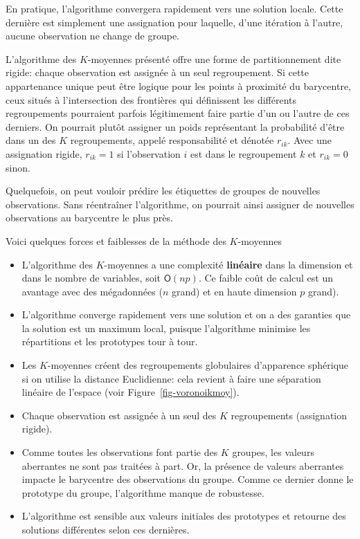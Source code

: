 \documentclass[
  11pt,
  letterpaper,
]{scrbook}
\providecommand{\tightlist}{%
  \setlength{\itemsep}{0pt}\setlength{\parskip}{0pt}}\usepackage{longtable,booktabs,array}
\theoremstyle{definition}
\theoremstyle{remark}
\begin{document}
En pratique, l'algorithme convergera rapidement vers une solution
locale. Cette dernière est simplement une assignation pour laquelle,
d'une itération à l'autre, aucune observation ne change de groupe.

L'algorithme des \(K\)-moyennes présenté offre une forme de
partitionnement dite rigide: chaque observation est assignée à un seul
regroupement. Si cette appartenance unique peut être logique pour les
points à proximité du barycentre, ceux situés à l'intersection des
frontières qui définissent les différents regroupements pourraient
parfois légitimement faire partie d'un ou l'autre de ces derniers. On
pourrait plutôt assigner un poids représentant la probabilité d'être
dans un des \(K\) regroupements, appelé responsabilité et dénotée
\(r_{ik}\). Avec une assignation rigide, \(r_{ik}=1\) si l'observation
\(i\) est dans le regroupement \(k\) et \(r_{ik}=0\) sinon.

Quelquefois, on peut vouloir prédire les étiquettes de groupes de
nouvelles observations. Sans réentraîner l'algorithme, on pourrait ainsi
assigner de nouvelles observations au barycentre le plus près.

Voici quelques forces et faiblesses de la méthode des \(K\)-moyennes

\begin{itemize}
\tightlist
\item
  L'algorithme des \(K\)-moyennes a une complexité \textbf{linéaire}
  dans la dimension et dans le nombre de variables, soit
  \(\mathsf{O}(np)\). Ce faible coût de calcul est un avantage avec des
  mégadonnées (\(n\) grand) et en haute dimension \(p\) grand).
\item
  L'algorithme converge rapidement vers une solution et on a des
  garanties que la solution est un maximum local, puisque l'algorithme
  minimise les répartitions et les prototypes tour à tour.
\item
  Les \(K\)-moyennes créent des regroupements globulaires d'apparence
  sphérique si on utilise la distance Euclidienne: cela revient à faire
  une séparation linéaire de l'espace (voir
  Figure~\ref{fig-voronoikmoy}).
\item
  Chaque observation est assignée à un seul des \(K\) regroupements
  (assignation rigide).
\item
  Comme toutes les observations font partie des \(K\) groupes, les
  valeurs aberrantes ne sont pas traitées à part. Or, la présence de
  valeurs aberrantes impacte le barycentre des observations du groupe.
  Comme ce dernier donne le prototype du groupe, l'algorithme manque de
  robustesse.
\item
  L'algorithme est sensible aux valeurs initiales des prototypes et
  retourne des solutions différentes selon ces dernières.
\end{itemize}
\end{document}
